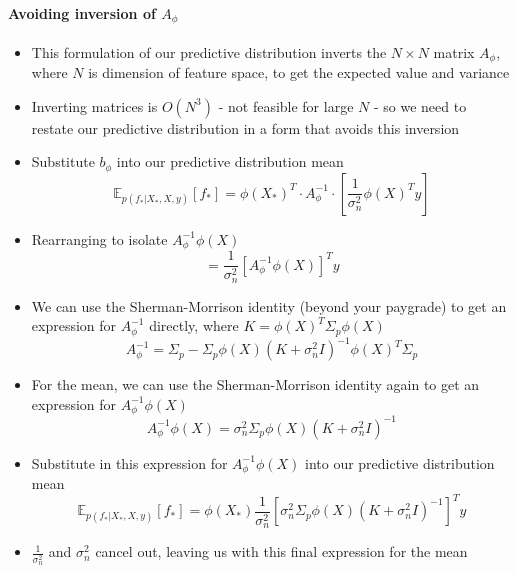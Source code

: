 \documentclass[12pt]{article}
\begin{document}
\paragraph{Avoiding inversion of $A_{\phi}$}
\begin{itemize}
    \item This formulation of our predictive distribution inverts the $N \times N$ matrix $A_{\phi}$, where $N$ is dimension of feature space, to get the expected value and variance
    \item Inverting matrices is $O(N^3)$ - not feasible for large $N$ - so we need to restate our predictive distribution in a form that avoids this inversion
    \item Substitute $b_{\phi}$ into our predictive distribution mean
\begin{equation}
    \mathbb{E}_{p(f_*|X_*,X,y)}[f_*] = \phi(X_*)^T \cdot A_\phi^{-1} \cdot \left[\frac{1}{\sigma_n^2}\phi(X)^Ty\right]
\end{equation}
    \item Rearranging to isolate $A_\phi^{-1}\phi(X)$
\begin{equation}
    = \frac{1}{\sigma_n^2}\left[A_{\phi}^{-1}\phi(X)\right]^Ty
\end{equation}
    \item We can use the Sherman-Morrison identity (beyond your paygrade) to get an expression for $A_{\phi}^{-1}$ directly, where $K =\phi(X)^T\Sigma_p\phi(X)$
\begin{equation}
    A_{\phi}^{-1} = \Sigma_p - \Sigma_p\phi(X)(K+\sigma_n^2I)^{-1}\phi(X)^T\Sigma_p
\end{equation}
    \item For the mean, we can use the Sherman-Morrison identity again to get an expression for $A_{\phi}^{-1}\phi(X)$
\begin{equation}
    A_{\phi}^{-1}\phi(X) = \sigma_n^2\Sigma_p\phi(X)(K+\sigma_n^2I)^{-1}
\end{equation}
    \item Substitute in this expression for $A_{\phi}^{-1}\phi(X)$ into our predictive distribution mean
\begin{equation}
    \mathbb{E}_{p(f_*|X_*,X,y)}[f_*] = \phi(X_*) \frac{1}{\sigma_n^2}\left[\sigma_n^2\Sigma_p\phi(X)(K+\sigma_n^2I)^{-1}\right]^Ty
\end{equation}
    \item $\frac{1}{\sigma_n^2}$ and $\sigma_n^2$ cancel out, leaving us with this final expression for the mean
\begin{equation}

\end{equation}
\end{itemize}
\end{document}
